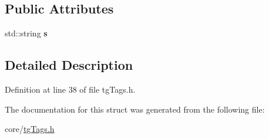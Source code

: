 \subsection*{Public Attributes}
\begin{DoxyCompactItemize}
\item 
\hypertarget{structtg_exception_ab91f7c37d05171544e219a1e0e8a7d88}{std\-::string {\bfseries s}}\label{structtg_exception_ab91f7c37d05171544e219a1e0e8a7d88}

\end{DoxyCompactItemize}


\subsection{Detailed Description}


Definition at line 38 of file tg\-Tags.\-h.



The documentation for this struct was generated from the following file\-:\begin{DoxyCompactItemize}
\item 
core/\hyperlink{tg_tags_8h}{tg\-Tags.\-h}\end{DoxyCompactItemize}
